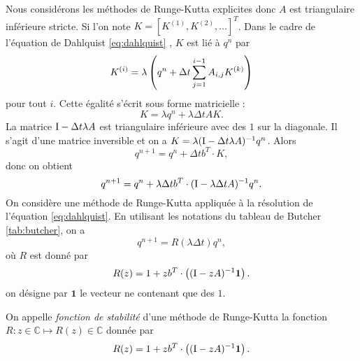 Nous considérons les méthodes de Runge-Kutta explicites donc $A$ est triangulaire inférieure stricte.
Si l'on note $K = [K^{(1)}, K^{(2)}, ...]^T$. Dans le cadre de l'équation de Dahlquist \eqref{eq:dahlquist} \cite{Hairer2006}, $K$ est lié à $q^n$ par
\begin{equation}
K^{(i)} = \lambda \left( q^n + \Delta t \displaystyle\sum\limits_{j=1}^{i-1} A_{i,j} K^{(k)} \right)
\end{equation}
pour tout $i$. Cette égalité s'écrit sous forme matricielle :
\begin{equation}
K = \lambda q^n +  \lambda \Delta t A K.
\end{equation}
La matrice $\text{I}-\Delta t \lambda A$ est triangulaire inférieure avec des $1$ sur la diagonale. Il s'agit d'une matrice inversible et on a $K = \lambda (\text{I}-\Delta t \lambda A)^{-1} q^n$. Alors
\begin{equation*}
q^{n+1} = q^n + \Delta t b^T \cdot K,
\end{equation*}
donc on obtient 
\begin{equation}
q^{n+1} = q^n + \lambda \Delta t b^T \cdot (\text{I} - \lambda \Delta t A)^{-1} q^n.
\end{equation} 
On considère une méthode de Runge-Kutta appliquée à la résolution de l'équation \eqref{eq:dahlquist}. En utilisant les notations du tableau de Butcher \ref{tab:butcher}, on a 
\begin{equation}
q^{n+1} = R(\lambda \Delta t) q^n,
\end{equation}
où $R$ est donné par
\begin{equation}
R(z) = 1 + z b^T \cdot \left( (\text{I} - z A)^{-1} \mathbf{1} \right).
\end{equation}
on désigne par $\mathbf{1}$ le vecteur ne contenant que des $1$.
\begin{definition}

On appelle \textit{fonction de stabilité} d'une méthode de Runge-Kutta la fonction $R : z \in \mathbb{C} \mapsto R(z) \in \mathbb{C}$ donnée par 
\begin{equation}
R(z) = 1 + z b^T \cdot \left( (\text{I} - z A)^{-1} \mathbf{1} \right).
\end{equation}
\end{definition}



